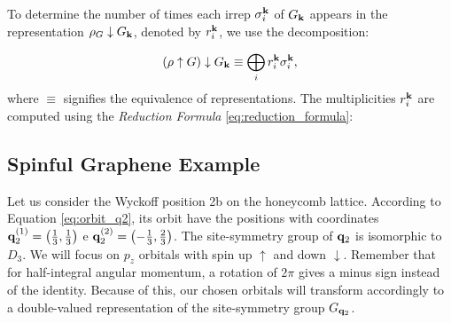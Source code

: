 To determine the number of times each irrep \(\sigma_i^{\vb{k}}\) of \(G_{\vb{k}}\) appears in the representation \(\rho_G \downarrow G_{\vb{k}}\), denoted by \(r_i^{\vb{k}}\), we use the decomposition:

\begin{equation} \label{eq:induce_subduce}
(\rho \uparrow G) \downarrow G_{\vb{k}} \equiv \bigoplus_i r_i^{\vb{k}} \sigma_i^{\vb{k}},
\end{equation}
where \(\equiv\) signifies the equivalence of representations. The multiplicities \(r_i^{\vb{k}}\) are computed using the \textit{Reduction Formula} \ref{eq:reduction_formula}:

\subsection{Spinful Graphene Example} \label{subsec:spinful_graphene}

Let us consider the Wyckoff position 2b on the honeycomb lattice. According to Equation \ref{eq:orbit_q2}, its orbit have the positions with coordinates ${\vb{q}}_2^{(1)} = \qty(\frac{1}{3}, \frac{1}{3})$ e ${\vb{q}}_2^{(2)} = \qty(-\frac{1}{3}, \frac{2}{3})$. The site-symmetry group of ${\vb{q}}_2$ is isomorphic to $D_3$. We will focus on $p_z$ orbitals with spin up $\uparrow$ and down $\downarrow$. Remember that for half-integral angular momentum, a rotation of $2\pi$ gives a minus sign instead of the identity. Because of this, our chosen orbitals will transform accordingly to a double-valued representation of the site-symmetry group $G_{{\vb{q}}_2}$.

